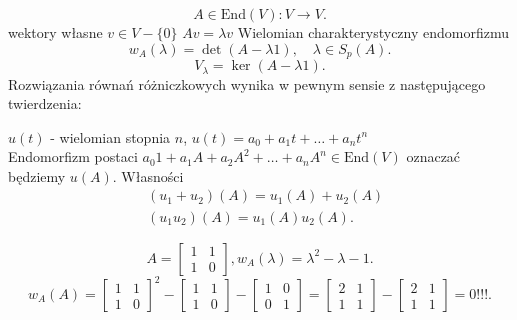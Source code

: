 \documentclass[../main.tex]{subfiles}
\begin{document}
\[
    A\in \text{End} ( V ): V\to V
.\] wektory własne $v\in V-\{0\}$  $A v = \lambda v$
Wielomian charakterystyczny endomorfizmu \[
    w_A(\lambda) = \det (A - \lambda 1),\quad \lambda\in S_p(A)
.\]
\[
    V_\lambda = \ker (A - \lambda 1)
.\]
Rozwiązania równań różniczkowych wynika w pewnym sensie z następującego twierdzenia:
\begin{obserwacja}
    $u(t)$ - wielomian stopnia $n$, $u(t) = a_0+a_1 t + \ldots + a_n t^n$\\
    Endomorfizm postaci $a_0 1 + a_1 A + a_2 A^2 + \ldots + a_n A^n \in \text{End} (V)$ oznaczać będziemy $u(A)$.
    Własności
    \begin{align}
        &(u_1+u_2)(A) = u_1(A) + u_2(A)\\
        &(u_1 u_2)(A) = u_1(A) u_2(A)
    .\end{align}
\end{obserwacja}
\begin{przyklad}
    \[
    A = \begin{bmatrix}
    1 & 1\\
    1 & 0\end{bmatrix},
    w_A(\lambda) = \lambda^2 - \lambda - 1
    .\]
    \[
        w_A(A) =
        \begin{bmatrix}
        1 & 1\\
        1 & 0\end{bmatrix} ^2 -
        \begin{bmatrix}
        1 & 1\\
        1 & 0\end{bmatrix} -
        \begin{bmatrix}
        1 & 0\\
        0 & 1\end{bmatrix} =
        \begin{bmatrix}
        2 & 1\\
        1 & 1\end{bmatrix} -
        \begin{bmatrix}
        2 & 1\\
        1 & 1\end{bmatrix} = 0!!!
    .\]
\end{przyklad}
\end{document}
